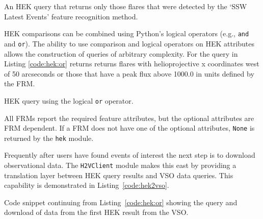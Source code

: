 \begin{listing}[H]
\caption{An HEK query that returns only those flares that were
  detected by the `SSW Latest Events' feature recognition method.}
\label{code:hek:frm}
\end{listing}

HEK comparisons can be combined using Python's logical operators (e.g., \texttt{and}
and \texttt{or}). The ability to use comparison and logical operators on HEK attributes allows 
the construction of queries of arbitrary complexity.
For the query in Listing \ref{code:hek:or} returns
returns flares with helioprojective x coordinates west of 50 arcseconds or 
those that have a peak flux above 1000.0 in units defined by the FRM.

\begin{listing}[H]
\caption{HEK query using the logical \texttt{or} operator.}
\label{code:hek:or}
\end{listing}
All FRMs report the required feature attributes, but the optional attributes 
are FRM dependent.  If a FRM does not have one of the optional attributes, 
\texttt{None} is returned by the \texttt{hek} module. 
 
Frequently after users have found events of interest the next step is to 
download observational data. The \texttt{H2VClient} module makes this
east by providing a translation layer between HEK query results
and VSO data queries. This capability is demonstrated in Listing~\ref{code:hek2vso}.
\begin{listing}[H]
\caption{Code snippet continuing from Listing~\ref{code:hek:or} showing the 
query and download of data from the first HEK result from the VSO.}
\label{code:hek2vso}
\end{listing}
